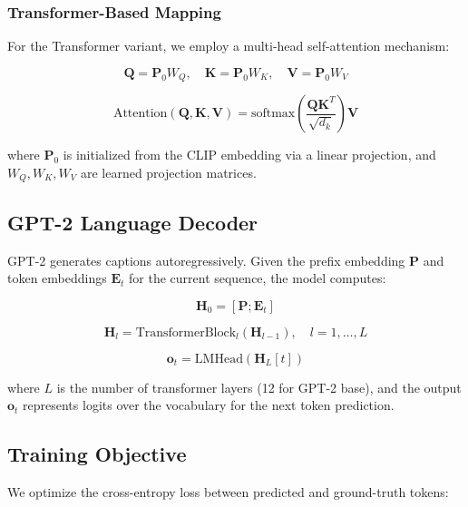 \documentclass[runningheads]{llncs}
\begin{document}
\subsubsection{Transformer-Based Mapping}

For the Transformer variant, we employ a multi-head self-attention mechanism:

\begin{equation}
\mathbf{Q} = \mathbf{P}_0 W_Q, \quad \mathbf{K} = \mathbf{P}_0 W_K, \quad \mathbf{V} = \mathbf{P}_0 W_V
\end{equation}

\begin{equation}
\text{Attention}(\mathbf{Q}, \mathbf{K}, \mathbf{V}) = \text{softmax}\left(\frac{\mathbf{Q}\mathbf{K}^T}{\sqrt{d_k}}\right)\mathbf{V}
\end{equation}

where $\mathbf{P}_0$ is initialized from the CLIP embedding via a linear projection, and $W_Q, W_K, W_V$ are learned projection matrices.

\subsection{GPT-2 Language Decoder}

GPT-2 generates captions autoregressively. Given the prefix embedding $\mathbf{P}$ and token embeddings $\mathbf{E}_t$ for the current sequence, the model computes:

\begin{equation}
\mathbf{H}_0 = [\mathbf{P}; \mathbf{E}_t]
\end{equation}

\begin{equation}
\mathbf{H}_l = \text{TransformerBlock}_l(\mathbf{H}_{l-1}), \quad l = 1, \ldots, L
\end{equation}

\begin{equation}
\mathbf{o}_t = \text{LMHead}(\mathbf{H}_L[t])
\end{equation}

where $L$ is the number of transformer layers (12 for GPT-2 base), and the output $\mathbf{o}_t$ represents logits over the vocabulary for the next token prediction.

\subsection{Training Objective}

We optimize the cross-entropy loss between predicted and ground-truth tokens:
\end{document}
